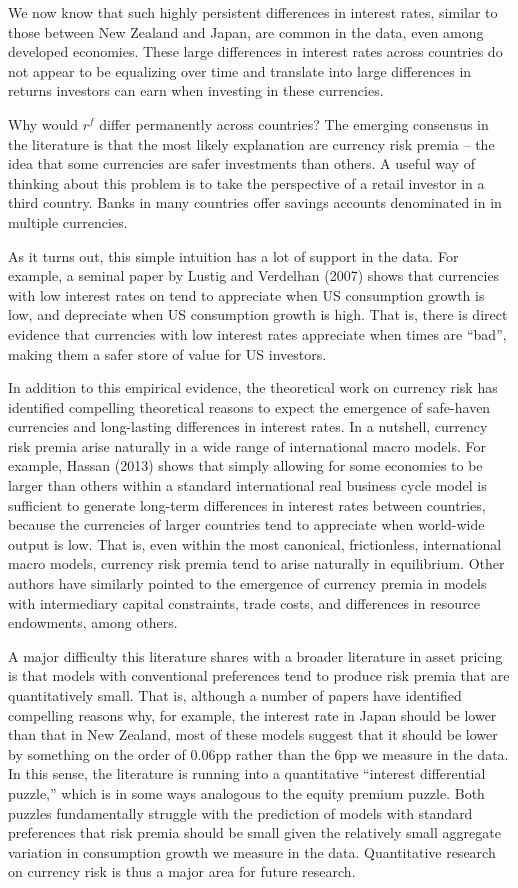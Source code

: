 \documentclass[12pt,letter]{article}
\theoremstyle{break} \theorembodyfont{\normalfont\itshape}
\theoremstyle{break}
\theoremstyle{break} \theorembodyfont{\normalfont\itshape}
\theoremstyle{break} \theorembodyfont{\normalfont\itshape}
\begin{document}
We now know that such highly persistent differences in interest rates, similar to those between New Zealand and Japan, are common in the data, even among developed economies. These large differences in interest rates across countries do not appear to be equalizing over time and translate into large differences in returns investors can earn when investing in these currencies. 

Why would $r^f$ differ permanently across countries? The emerging consensus in the literature is that the most likely explanation are currency risk premia -- the idea that some currencies are safer investments than others. A useful way of thinking about this problem is to take the perspective of a retail investor in a third country. Banks in many countries offer savings accounts denominated in in multiple currencies. 

As it turns out, this simple intuition has a lot of support in the data. For example, a seminal paper by Lustig and Verdelhan (2007) shows that currencies with low interest rates on tend to appreciate when US consumption growth is low, and depreciate when US consumption growth is high. That is, there is direct evidence that currencies with low interest rates appreciate when times are ``bad'', making them a safer store of value for US investors.

In addition to this empirical evidence, the theoretical work on currency risk has identified compelling theoretical reasons to expect the emergence of safe-haven currencies and long-lasting differences in interest rates. In a nutshell, currency risk premia arise naturally in a wide range of international macro models. For example, Hassan (2013) shows that simply allowing for some economies to be larger than others within a standard international real business cycle model is sufficient to generate long-term differences in interest rates between countries, because the currencies of larger countries tend to appreciate when world-wide output is low. That is, even within the most canonical, frictionless, international macro models, currency risk premia tend to arise naturally in equilibrium. Other authors have similarly pointed to the emergence of currency premia in models with intermediary capital constraints, trade costs, and differences in resource endowments, among others. 

A major difficulty this literature shares with a broader literature in asset pricing is that models with conventional preferences tend to produce risk premia that are quantitatively small. That is, although a number of papers have identified compelling reasons why, for example, the interest rate in Japan should be lower than that in New Zealand, most of these models suggest that it should be lower by something on the order of 0.06pp rather than the 6pp we measure in the data. In this sense, the literature is running into a quantitative ``interest differential puzzle,'' which is in some ways analogous to the equity premium puzzle. Both puzzles fundamentally struggle with the prediction of models with standard preferences that risk premia should be small given the relatively small aggregate variation in consumption growth we measure in the data. Quantitative research on currency risk is thus a major area for future research.
\end{document}
